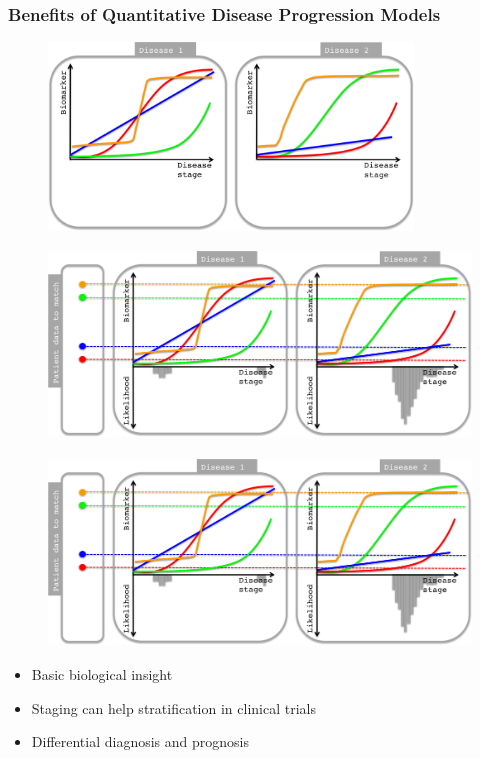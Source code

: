 \begin{frame}
\frametitle{Benefits of Quantitative Disease Progression Models}

\begin{overprint}
 \begin{figure}
 \centering
\includegraphics[height=5cm,trim=0 0 650 0,clip]{dpmDiffDiag1.png}
\end{figure}

 \begin{figure}
 \centering
\includegraphics[height=5cm,trim=0 0 650 0,clip]{dpmDiffDiag2.png}
\end{figure}

 \begin{figure}
 \centering
\includegraphics[height=5cm,trim=0 0 0 0,clip]{dpmDiffDiag2.png}
\end{figure}

\end{overprint}

\vspace{1em}
\begin{itemize}
  \item Basic biological insight
  \item Staging can help stratification in clinical trials
  \item Differential diagnosis and prognosis
 
 \vspace{1.5em}
\end{itemize}

\end{frame}
